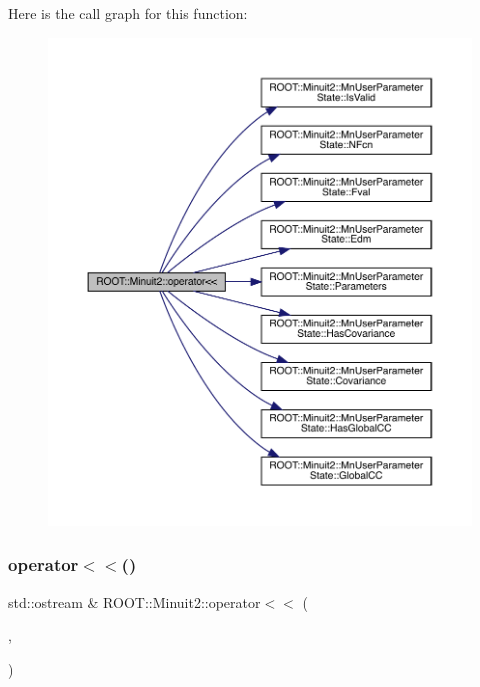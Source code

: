 Here is the call graph for this function\+:
\nopagebreak
\begin{figure}[H]
\begin{center}
\leavevmode
\includegraphics[width=350pt]{d6/d3a/namespaceROOT_1_1Minuit2_a30dd5b9978bba19603bb3fb0f7427ddc_cgraph}
\end{center}
\end{figure}
\mbox{\label{namespaceROOT_1_1Minuit2_a490766f2dd62363c6729e716a8da5da8}} 
\subsubsection{\texorpdfstring{operator$<$$<$()}{operator<<()}\hspace{0.1cm}{\footnotesize\ttfamily [9/11]}}
{\footnotesize\ttfamily std\+::ostream \& R\+O\+O\+T\+::\+Minuit2\+::operator$<$$<$ (\begin{DoxyParamCaption}\item[{std\+::ostream \&}]{,  }\item[{const \mbox{\hyperlink{classROOT_1_1Minuit2_1_1MnMachinePrecision}{Mn\+Machine\+Precision}} \&}]{ }\end{DoxyParamCaption})}

